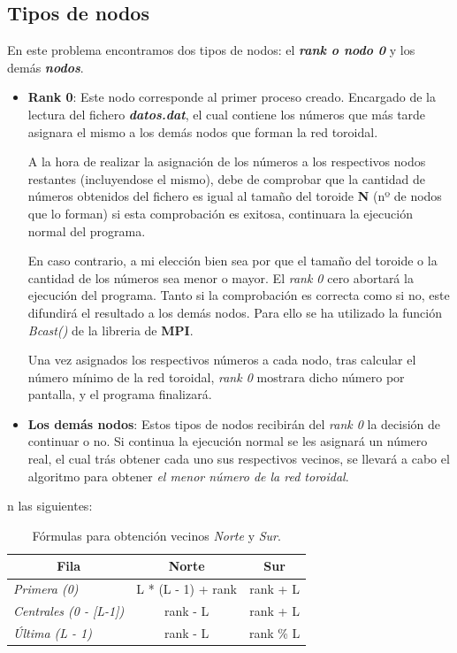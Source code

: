 \documentclass[11pt]{article}
\begin{document}
\subsection{Tipos de nodos}
En este problema encontramos dos tipos de nodos: el \textbf{\textit{rank o nodo 0}} y los demás \textbf{\textit{nodos}}.

\begin{itemize}
	\item \textbf{Rank 0}: Este nodo corresponde al primer proceso creado. Encargado de la lectura del fichero \textit{\textbf{datos.dat}}, el cual contiene los números que más tarde asignara el mismo a los demás nodos que forman la red toroidal.
	
	A la hora de realizar la asignación de los números a los respectivos nodos restantes (incluyendose el mismo), debe de comprobar que la cantidad de números obtenidos del fichero es igual al tamaño del toroide \textbf{N} (nº de nodos que lo forman) si esta comprobación es exitosa, continuara la ejecución normal del programa.
	
	En caso contrario, a mi elección bien sea por que el tamaño del toroide o la cantidad de los números sea menor o mayor. El \textit{rank 0} cero abortará la ejecución del programa. 
	Tanto si la comprobación es correcta como si no, este difundirá el resultado a los demás nodos. Para ello se ha utilizado la función \textit{Bcast()} de la libreria de \textbf{MPI}.
	
	Una vez asignados los respectivos números a cada nodo, tras calcular el número mínimo de la red toroidal, \textit{rank 0} mostrara dicho número por pantalla, y el programa finalizará.
	
	\item \textbf{Los demás nodos}: Estos tipos de nodos recibirán del \textit{rank 0} la decisión de continuar o no. Si continua la ejecución normal se les asignará un número real, el cual trás obtener cada uno sus respectivos vecinos, se  llevará a cabo el algoritmo para obtener \textit{el menor número de la red toroidal}.
\end{itemize}


n las siguientes:
\\

\begin{table}[H]
\centering
\begin{tabular}{|l|c|c|}
\hline
\multicolumn{1}{|c|}{\textbf{Fila}} & \textbf{Norte}     & \textbf{Sur} \\ \hline
\textit{Primera (0)}                & L * (L - 1) + rank & rank + L     \\ \hline
\textit{Centrales (0 - {[}L-1{]})}  & rank - L           & rank + L     \\ \hline
\textit{Última (L - 1)}             & rank - L           & rank \% L    \\ \hline
\end{tabular}
\caption{Fórmulas para obtención vecinos \textit{Norte} y \textit{Sur}.}
\label{tab:filas}
\end{table}
\end{document}
